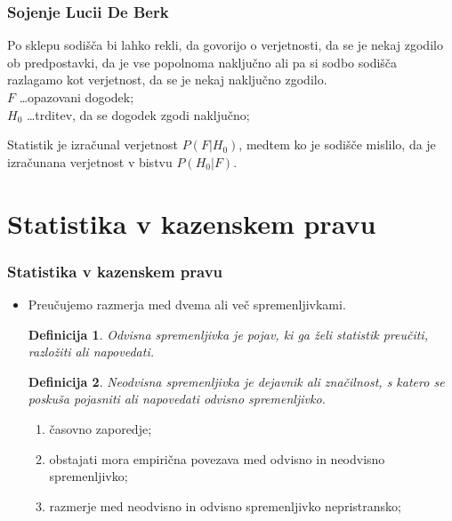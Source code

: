 \documentclass{beamer}
\newtheorem{definicija}{Definicija}
\begin{document}
\begin{frame}
   \frametitle{Sojenje Lucii De Berk}
   Po sklepu sodišča bi lahko rekli, da govorijo o verjetnosti, da se je nekaj zgodilo ob predpostavki, da je vse popolnoma naključno ali 
   pa si sodbo sodišča razlagamo kot verjetnost, da se je nekaj naključno zgodilo. \\ \vspace{4mm}
  $F$ \dots opazovani dogodek;\\
  $H_0$ \dots trditev, da se dogodek zgodi naključno;\\ \vspace{3mm}
  \begin{block}{}
   Statistik je izračunal verjetnost $P(F \lvert H_0)$, medtem ko je sodišče mislilo, da je izračunana  verjetnost v bistvu $P(H_0 \lvert F)$.
  \end{block}
\end{frame}
\section{Statistika v kazenskem pravu}

\begin{frame}
    \frametitle{Statistika v kazenskem pravu}
    \begin{itemize}
        \item Preučujemo razmerja med dvema ali več spremenljivkami.\\ \vspace{2mm}
         \begin{definicija}
            \textit{Odvisna spremenljivka} je pojav, ki ga želi statistik preučiti, razložiti ali napovedati.
        \end{definicija}
        \begin{definicija}
            \textit{Neodvisna spremenljivka} je dejavnik ali značilnost, s katero se poskuša pojasniti ali napovedati odvisno spremenljivko.
        \end{definicija}        
        \begin{enumerate}
            \item časovno zaporedje;
            \item obstajati mora empirična povezava med odvisno in neodvisno spremenljivko;
            \item razmerje med neodvisno in odvisno spremenljivko nepristransko;
        \end{enumerate}
    \end{itemize}
\end{frame}
\end{document}
